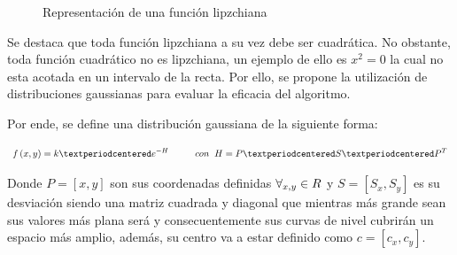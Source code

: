 \begin{figure}[htb]
  \begin{center}
    \caption{Representación de una función lipzchiana}
    \label{FunGauss}
  \end{center}
\end{figure}

Se destaca que toda función lipzchiana a su vez debe ser cuadrática. No obstante, toda función cuadrático no es lipzchiana, un ejemplo de ello es $x^2 = 0$ la cual no esta acotada en un intervalo de la recta. Por ello, se propone la utilización de distribuciones gaussianas para evaluar la eficacia del algoritmo.

Por ende, se define una distribución gaussiana de la siguiente forma:

\begin{equation*}
	f\left(x,y\right)=k·e^{-H}\hspace{10mm}con\hspace{2mm}H=P·S·P^{T}
\end{equation*}

Donde $P=\left[x,y\right]$ son sus coordenadas definidas $\forall_{x,y}\in\mathnormal{R}$ y $S=\left[S_x,S_y\right]$ es su desviación siendo una matriz cuadrada y diagonal que mientras más grande sean sus valores más plana será y consecuentemente sus curvas de nivel cubrirán un espacio más amplio, además, su centro va a estar definido como $c=\left[c_x,c_y\right]$.

